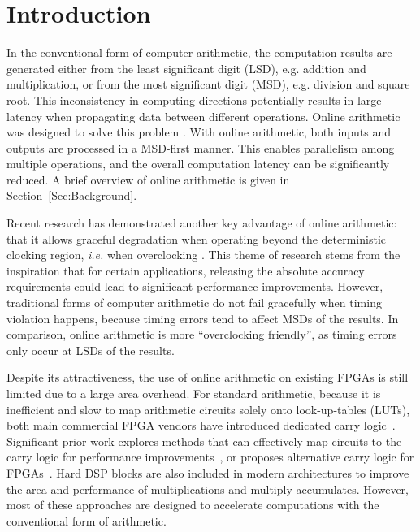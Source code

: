 \documentclass[conference]{IEEEtran}
\begin{document}
\section{Introduction}\label{Sec:Intro}\vspace{-0.5ex}
In the conventional form of computer arithmetic, the computation results are generated either from the least significant digit (LSD), e.g. addition and multiplication, or from the most significant digit (MSD), e.g. division and square root. This inconsistency in computing directions potentially results in large latency when propagating data between different operations. Online arithmetic was designed to solve this problem \cite{Ercegovac_OnlineOverview,Ercegovac_Book}. With online arithmetic, both inputs and outputs are processed in a MSD-first manner. This enables parallelism among multiple operations, and the overall computation latency can be significantly reduced. A brief overview of online arithmetic is given in Section~\ref{Sec:Background}.\vspace{-0.5ex}

Recent research has demonstrated another key advantage of online arithmetic: that it allows graceful degradation when operating beyond the deterministic clocking region,  \textit{i.e.} when overclocking \cite{SKDAC14}. This theme of research stems from the inspiration that for certain applications, releasing the absolute accuracy requirements could lead to significant performance improvements. However, traditional forms of computer arithmetic do not fail gracefully when timing violation happens, because timing errors tend to affect MSDs of the results. In comparison, online arithmetic is more ``overclocking friendly'', as timing errors only occur at LSDs of the results.\vspace{-0.5ex}

Despite its attractiveness, the use of online arithmetic on existing FPGAs is still limited due to a large area overhead. For standard arithmetic, because it is inefficient and slow to map arithmetic circuits solely onto look-up-tables (LUTs), both main commercial FPGA vendors have introduced dedicated carry logic~\cite{Virtex6}. Significant prior work explores methods that can effectively map circuits to the carry logic for performance improvements~\cite{FPL10_FPGA_CarryChain}, or proposes alternative carry logic for FPGAs~\cite{FPGA_CarryChain_New1,FPGA_CarryChain_New2}. Hard DSP blocks are also included in modern architectures to improve the area and performance of multiplications and multiply accumulates. However, most of these approaches are designed to accelerate computations with the conventional form of arithmetic.\vspace{-0.5ex}
\end{document}
